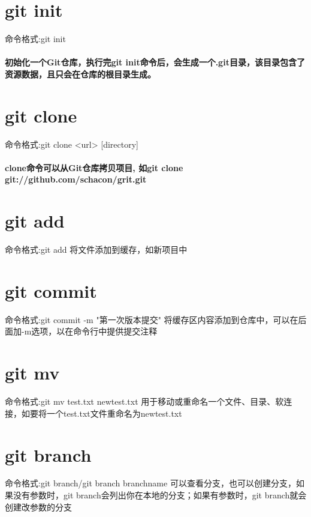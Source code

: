 \documentclass[a4paper, 12pt]{article}
\begin{document}
	\title{\color{red}{\huge 实验报告}}
	\author{\color{blue}{\large 周雍凡}}
	\date{\today}
	\maketitle
	
	\tableofcontents
	\newpage
	
	
	\section{git init}
	
	{\color{blue} 命令格式:git init}
	\paragraph{初始化一个Git仓库，执行完git init命令后，会生成一个.git目录，该目录包含了资源数据，且只会在仓库的根目录生成。}
	\section{git clone}

	{\color{blue} 命令格式:git clone <url> [directory]}
	\paragraph{clone命令可以从Git仓库拷贝项目,
	如git clone git://github.com/schacon/grit.git}
	
	\section{git add}
	{\color{blue} 命令格式:git add}
	将文件添加到缓存，如新项目中
	
	\section{git commit}
	{\color{blue} 命令格式:git commit -m "第一次版本提交"}
	将缓存区内容添加到仓库中，可以在后面加-m选项，以在命令行中提供提交注释


	\section{git mv}
	{\color{blue} 命令格式:git mv test.txt newtest.txt}
	用于移动或重命名一个文件、目录、软连接，如要将一个test.txt文件重命名为newtest.txt
	
	\section{git branch}
	{\color{blue} 命令格式:git branch/git branch branchname}
	可以查看分支，也可以创建分支，如果没有参数时，git branch会列出你在本地的分支；如果有参数时，git branch就会创建改参数的分支
	
\end{document}
